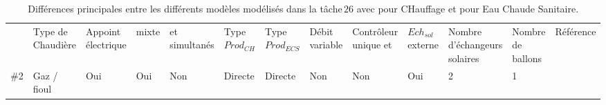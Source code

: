 \begin{table}
\centering
{}
\caption{Différences principales entre les différents modèles modélisés dans la tâche\,$26$
         avec  pour CHauffage et  pour Eau Chaude Sanitaire.}
\label{tab:diff_ssc}
\begin{tabular}{l *{6}{C{2.2cm}} *{5}{G} G}
    \toprule
            & Type de Chaudière    & Appoint électrique  &  mixte  &  et  simultanés & Type $Prod_{CH}$ & Type $Prod_{ECS}$ & Débit  variable & Contrôleur unique  et  & $Ech_{sol}$ externe & Nombre d’échangeurs solaires & Nombre de ballons & Référence \\
    \#2     & Gaz / fioul          & Oui                 & Oui             & Non                              & Directe          & Directe   & Non   & Non   & Oui   & 2 & 1 & \cite{Ellehauge2002}  \\

\end{tabular}
\end{table}
